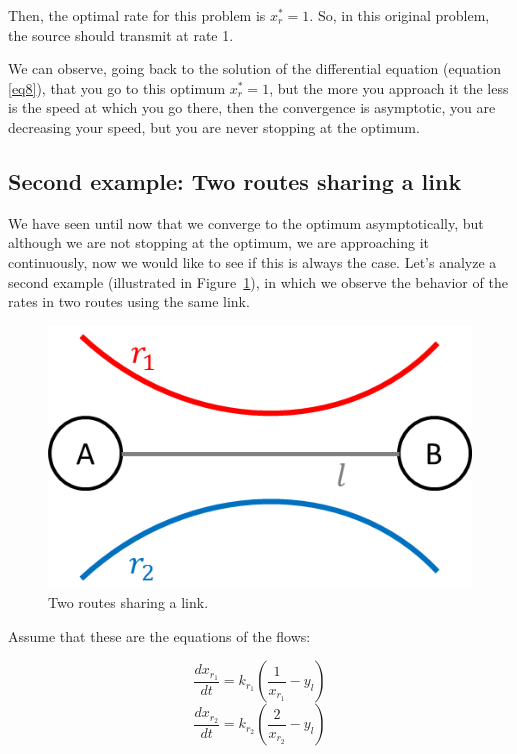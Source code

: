 Then, the optimal rate for this problem is $x^*_r = 1$.
So, in this original problem, the source should transmit at rate 1.

We can observe, going back to the solution of the differential equation (equation \eqref{eq8}), that you go to this optimum $x^*_r = 1$, but the more you approach it the less is the speed at which you go there, then the convergence is asymptotic, you are decreasing your speed, but you are never stopping at the optimum.

\subsection{Second example: Two routes sharing a link}

We have seen until now that we converge to the optimum asymptotically, but although we are not stopping at the optimum, we are approaching it continuously, now we would like to see if this is always the case. Let's analyze a second example (illustrated in Figure~\ref{figur3}), in which we observe the behavior of the rates in two routes using the same link.

\begin{figure}[h!]
\centering
\includegraphics[scale=.7]{1Link2Routes}
\caption{Two routes sharing a link.}
\label{figur3}
\end{figure}

Assume that these are the equations of the flows:

\begin{equation}
\frac{dx_{r_1}}{dt}=k_{r_1}(\frac{1}{x_{r_1}} - y_{l})
\label{eq14}
\end{equation}
\begin{equation}
\frac{dx_{r_2}}{dt}=k_{r_2}(\frac{2}{x_{r_2}} - y_{l})
\label{eq15}
\end{equation}

